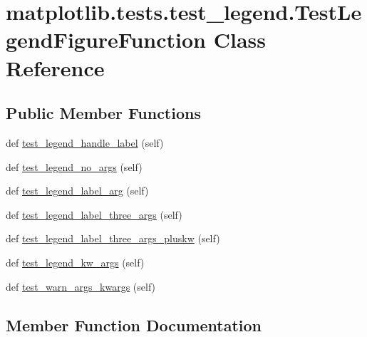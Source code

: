 \hypertarget{classmatplotlib_1_1tests_1_1test__legend_1_1TestLegendFigureFunction}{}\section{matplotlib.\+tests.\+test\+\_\+legend.\+Test\+Legend\+Figure\+Function Class Reference}
\label{classmatplotlib_1_1tests_1_1test__legend_1_1TestLegendFigureFunction}
\subsection*{Public Member Functions}
\begin{DoxyCompactItemize}
\item 
def \hyperlink{classmatplotlib_1_1tests_1_1test__legend_1_1TestLegendFigureFunction_afb2ad39d7adab29d4c7cab1425ff8302}{test\+\_\+legend\+\_\+handle\+\_\+label} (self)
\item 
def \hyperlink{classmatplotlib_1_1tests_1_1test__legend_1_1TestLegendFigureFunction_a68db0535432f26988db30980bc904481}{test\+\_\+legend\+\_\+no\+\_\+args} (self)
\item 
def \hyperlink{classmatplotlib_1_1tests_1_1test__legend_1_1TestLegendFigureFunction_a343da21a3d426f70d65f40c781899381}{test\+\_\+legend\+\_\+label\+\_\+arg} (self)
\item 
def \hyperlink{classmatplotlib_1_1tests_1_1test__legend_1_1TestLegendFigureFunction_acc595ec6d35d02f8263b8d3e5b148e08}{test\+\_\+legend\+\_\+label\+\_\+three\+\_\+args} (self)
\item 
def \hyperlink{classmatplotlib_1_1tests_1_1test__legend_1_1TestLegendFigureFunction_ace9ff57a1318633904bc8cc1b4be81e7}{test\+\_\+legend\+\_\+label\+\_\+three\+\_\+args\+\_\+pluskw} (self)
\item 
def \hyperlink{classmatplotlib_1_1tests_1_1test__legend_1_1TestLegendFigureFunction_a4afa02b82b68e42910ccb54d5314d9ae}{test\+\_\+legend\+\_\+kw\+\_\+args} (self)
\item 
def \hyperlink{classmatplotlib_1_1tests_1_1test__legend_1_1TestLegendFigureFunction_a6f0059cd9d63f3415dcd7bbe45f47f9b}{test\+\_\+warn\+\_\+args\+\_\+kwargs} (self)
\end{DoxyCompactItemize}


\subsection{Member Function Documentation}
\mbox{\label{classmatplotlib_1_1tests_1_1test__legend_1_1TestLegendFigureFunction_afb2ad39d7adab29d4c7cab1425ff8302}} 
